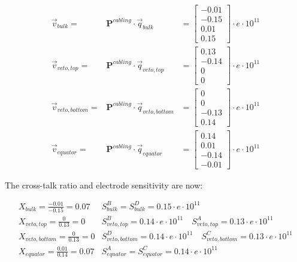 \begin{equation}
\begin{array}{rcl}
\vec{v}_{bulk} =& \bm{P}^{cabling} \cdot \vec{q}_{bulk} &= 
\begin{bmatrix}
-0.01 \\ -0.15 \\ 0.01 \\ 0.15
\end{bmatrix}
\cdot e \cdot 10^{11}
\\
\vec{v}_{veto,top} =& \bm{P}^{cabling} \cdot \vec{q}_{veto,top} &= 
\begin{bmatrix}
0.13 \\ -0.14 \\ 0 \\ 0
\end{bmatrix}
\cdot e \cdot 10^{11}
\\
\vec{v}_{veto,bottom} =& \bm{P}^{cabling} \cdot \vec{q}_{veto,bottom} &= 
\begin{bmatrix}
0 \\ 0 \\ -0.13 \\ 0.14
\end{bmatrix}
\cdot e \cdot 10^{11}
\\
\vec{v}_{equator} =& \bm{P}^{cabling} \cdot \vec{q}_{equator} &= 
\begin{bmatrix}
0.14 \\ 0.01 \\ -0.14 \\ -0.01
\end{bmatrix}
\cdot e \cdot 10^{11}
\end{array}
\end{equation}

The cross-talk ratio and electrode sensitivity are now:

\begin{equation}
\begin{array}{cc}
X_{bulk} = \frac{-0.01}{-0.15} = 0.07 & S_{bulk}^{B} = S_{bulk}^{D} = 0.15 \cdot e \cdot 10^{11}
\\
X_{veto,top} = \frac{0}{0.13} = 0 & S_{veto,top}^{B} = 0.14 \cdot e \cdot 10^{11} \quad S_{veto,top}^{A} = 0.13 \cdot e \cdot 10^{11}
\\
X_{veto,bottom} = \frac{0}{0.13} = 0 & S_{veto,bottom}^{D} = 0.14 \cdot e \cdot 10^{11} \quad S_{veto,bottom}^{C} = 0.13 \cdot e \cdot 10^{11}
\\
X_{equator} = \frac{0.01}{0.14} = 0.07 & S_{equator}^{A} = S_{equator}^{C} = 0.14 \cdot e \cdot 10^{11}
\end{array}
\end{equation}

